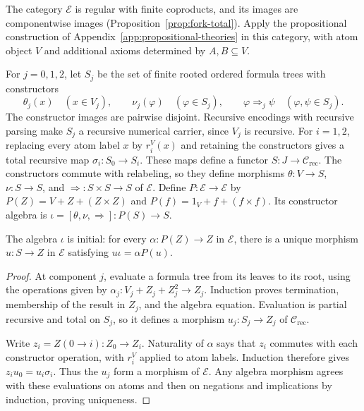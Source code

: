 The category $\mathcal E$ is regular with finite coproducts, and its
images are componentwise images (Proposition~\ref{prop:fork-total}).
Apply the propositional construction of
Appendix~\ref{app:propositional-theories} in this category, with atom
object $V$ and additional axioms determined by $A,B\subseteq V$.

For $j=0,1,2$, let $S_j$ be the set of finite rooted ordered formula trees
with constructors
\[
 \theta_j(x)\quad(x\in V_j),\qquad
 \nu_j(\varphi)\quad(\varphi\in S_j),\qquad
 \varphi\Rightarrow_j\psi\quad(\varphi,\psi\in S_j).
\]
The constructor images are pairwise disjoint. Recursive encodings with
recursive parsing make $S_j$ a recursive numerical carrier, since
$V_j$ is recursive. For $i=1,2$, replacing every atom label $x$ by
$r_i^V(x)$ and retaining the constructors gives a total recursive map
$\sigma_i:S_0\to S_i$. These maps define a functor
$S:J\to\mathcal C_{\mathrm{rec}}$. The constructors commute with
relabeling, so they define morphisms $\theta:V\to S$,
$\nu:S\to S$, and ${\Rightarrow}:S\times S\to S$ of $\mathcal E$.
Define $P:\mathcal E\to\mathcal E$ by
$P(Z)=V+Z+(Z\times Z)$ and
$P(f)=1_V+f+(f\times f)$. Its constructor algebra is
$\iota=[\theta,\nu,\Rightarrow]:P(S)\to S$.

\begin{proposition}\label{prop:fork-syntax-initial}
The algebra $\iota$ is initial: for every
$\alpha:P(Z)\to Z$ in $\mathcal E$, there is a unique morphism
$u:S\to Z$ in $\mathcal E$ satisfying $u\iota=\alpha P(u)$.
\end{proposition}
\begin{proof}
At component $j$, evaluate a formula tree from its leaves to its root,
using the operations given by $\alpha_j:V_j+Z_j+Z_j^2\to Z_j$.
Induction proves termination, membership of the result in $Z_j$, and
the algebra equation. Evaluation is partial recursive and total on
$S_j$, so it defines a morphism $u_j:S_j\to Z_j$ of
$\mathcal C_{\mathrm{rec}}$.

Write $z_i=Z(0\to i):Z_0\to Z_i$. Naturality of $\alpha$
says that $z_i$ commutes with each constructor operation, with
$r_i^V$ applied to atom labels. Induction therefore gives
$z_i u_0=u_i\sigma_i$. Thus the $u_j$ form a morphism of
$\mathcal E$. Any algebra morphism agrees with these evaluations
on atoms and then on negations and implications by induction,
proving uniqueness.
\end{proof}

